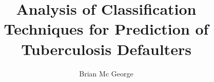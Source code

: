 \documentclass{sig-alternate-05-2015}
\begin{document}






%

\title{Analysis of Classification Techniques for Prediction of Tuberculosis Defaulters}
%
%
%
%
%

%
\author{
%
%
\alignauthor
Brian Mc George\\
       \\
       \\
}
\end{document}
